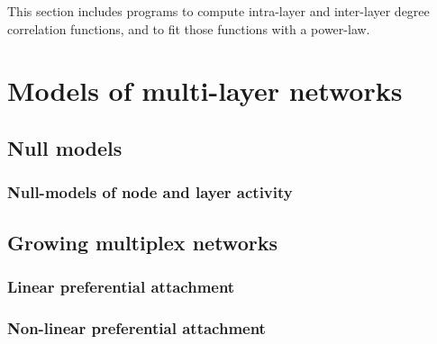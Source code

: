 \documentclass[a4paper,11pt]{book}
\begin{document}
This section includes programs to compute intra-layer and inter-layer
degree correlation functions, and to fit those functions with a
power-law.






\clearpage

\chapter{Models of multi-layer networks}

\section{Null models}

\subsection{Null-models of node and layer activity}





\clearpage


\section{Growing multiplex networks}

\subsection{Linear preferential attachment}





\clearpage

\subsection{Non-linear preferential attachment}
\end{document}
